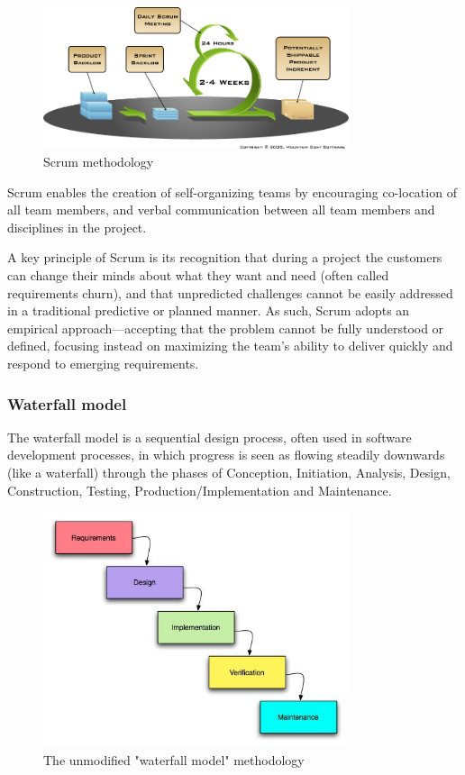 	\begin{figure}[scrum]
		\centering
		\includegraphics[width=0.8\textwidth]{prestudy/development_process/scrum.png}
		\caption{Scrum methodology}
		\label{fig:usecase}
	\end{figure}
	
	Scrum enables the creation of self-organizing teams by encouraging co-location of all team members, and verbal communication between all team members and disciplines in the project.\newline
	
	A key principle of Scrum is its recognition that during a project the customers can change their minds about what they want and need (often called requirements churn), and that unpredicted challenges cannot be easily addressed in a traditional predictive or planned manner. As such, Scrum adopts an empirical approach—accepting that the problem cannot be fully understood or defined, focusing instead on maximizing the team’s ability to deliver quickly and respond to emerging requirements.\newline

	\subsubsection{Waterfall model}
	The waterfall model is a sequential design process, often used in software development processes, in which progress is seen as flowing steadily downwards (like a waterfall) through the phases of Conception, Initiation, Analysis, Design, Construction, Testing, Production/Implementation and Maintenance.\newline
	
	\begin{figure}[waterfall]
		\centering
		\includegraphics[width=0.8\textwidth]{prestudy/development_process/waterfall.jpg}
		\caption{The unmodified "waterfall model" methodology}
		\label{fig:usecase}
	\end{figure}
	
